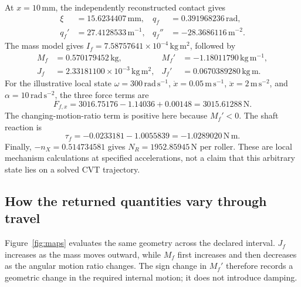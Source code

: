 \documentclass[11pt,letterpaper]{article}
\numberwithin{equation}{section}
\begin{document}
At $x=10\,\mathrm{mm}$, the independently reconstructed contact gives
\begin{align*}
  \xi&=15.6234407\,\mathrm{mm},&
  q_f&=0.391968236\,\mathrm{rad},\\
  q_f'&=27.4128533\,\mathrm{m^{-1}},&
  q_f''&=-28.3686116\,\mathrm{m^{-2}}.
\end{align*}
The mass model gives $I_f=7.58757641\times10^{-4}\,\mathrm{kg\,m^2}$, followed by
\begin{align*}
  M_f&=0.570179452\,\mathrm{kg},&
  M_f'&=-1.18011790\,\mathrm{kg\,m^{-1}},\\
  J_f&=2.33181100\times10^{-3}\,\mathrm{kg\,m^2},&
  J_f'&=0.0670389280\,\mathrm{kg\,m}.
\end{align*}
For the illustrative local state $\omega=300\,\mathrm{rad\,s^{-1}}$, $\dot x=0.05\,\mathrm{m\,s^{-1}}$, $\ddot x=2\,\mathrm{m\,s^{-2}}$, and $\alpha=10\,\mathrm{rad\,s^{-2}}$, the three force terms are
\begin{equation}
  F_{f,x}=3016.75176-1.14036+0.00148
          =3015.61288\,\mathrm{N}.
\end{equation}
The changing-motion-ratio term is positive here because $M_f'<0$. The shaft reaction is
\begin{equation}
  \tau_f=-0.0233181-1.0055839=-1.0289020\,\mathrm{N\,m}.
\end{equation}
Finally, $-n_X=0.514734581$ gives $N_R=1952.85945\,\mathrm{N}$ per roller. These are local mechanism calculations at specified accelerations, not a claim that this arbitrary state lies on a solved CVT trajectory.

\subsection{How the returned quantities vary through travel}

Figure~\ref{fig:maps} evaluates the same geometry across the declared interval. $J_f$ increases as the mass moves outward, while $M_f$ first increases and then decreases as the angular motion ratio changes. The sign change in $M_f'$ therefore records a geometric change in the required internal motion; it does not introduce damping.
\end{document}
